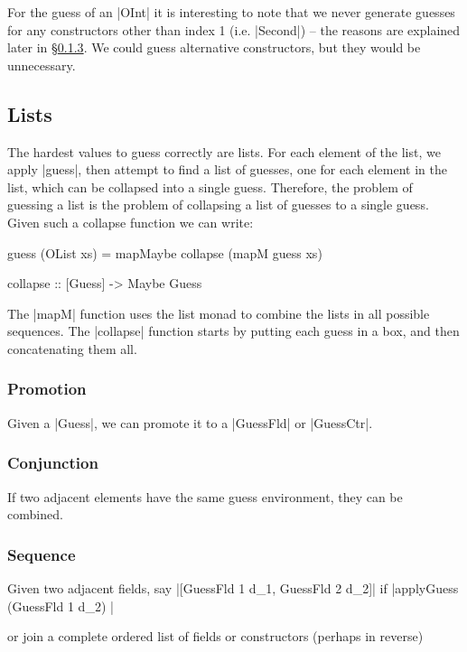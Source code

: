 \documentclass[preprint,draft]{sigplanconf}
\begin{document}
For the guess of an |OInt| it is interesting to note that we never generate guesses for any constructors other than index 1 (i.e. |Second|) -- the reasons are explained later in \S\ref{sec:guess_lists_sequence}. We could guess alternative constructors, but they would be unnecessary.

\subsection{Lists}

The hardest values to guess correctly are lists. For each element of the list, we apply |guess|, then attempt to find a list of guesses, one for each element in the list, which can be collapsed into a single guess. Therefore, the problem of guessing a list is the problem of collapsing a list of guesses to a single guess. Given such a collapse function we can write:

\begin{code}
guess (OList xs) = mapMaybe collapse (mapM guess xs)

collapse :: [Guess] -> Maybe Guess
\end{code}

The |mapM| function uses the list monad to combine the lists in all possible sequences. The |collapse| function starts by putting each guess in a box, and then concatenating them all.

\subsubsection{Promotion}

Given a |Guess|, we can promote it to a |GuessFld| or |GuessCtr|.

\subsubsection{Conjunction}

If two adjacent elements have the same guess environment, they can be combined.

\subsubsection{Sequence}
\label{sec:guess_lists_sequence}

Given two adjacent fields, say |[GuessFld 1 d_1, GuessFld 2 d_2]| if |applyGuess (GuessFld 1 d_2) |

 or join a complete ordered list of fields or constructors (perhaps in reverse)
\end{document}
